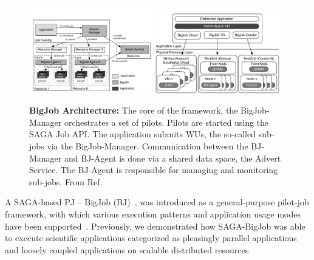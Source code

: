 \documentclass[]{svjour3}
\begin{document}
\begin{figure}[t]
  \centering
   \includegraphics[width=0.48\textwidth]{figures/re_bigjob_interactions.pdf}
  \includegraphics[width=0.48\textwidth]{figures/distributed_pilot_job.pdf}

        \caption{\textbf{BigJob Architecture:} The core of the
          framework, the BigJob-Manager orchestrates a set of
          pilots. Pilots are started using the SAGA Job API. The
          application submits WUs, the so-called sub-jobs via the
          BigJob-Manager. Communication between the BJ-Manager and
          BJ-Agent is done via a shared data space, the Advert
          Service. The BJ-Agent is responsible for managing and
          monitoring sub-jobs. From
          Ref.~\cite{saga_bigjob_condor_cloud}}
        \label{fig:figures_re_bigjob_interactions}
\end{figure}

A SAGA-based PJ -- BigJob
(BJ)~\cite{bigjob_web,saga_bigjob_condor_cloud}, was introduced as a
general-purpose pilot-job framework, with which various execution
patterns and application usage modes have been
supported~\cite{async_repex11,saga-royalsoc}. Previously, we
demonstrated how SAGA-BigJob was able to execute scientific
applications categorized as pleasingly parallel applications and
loosely coupled applications on scalable distributed
resources\cite{DBLP:conf/hpdc/KimHMAJ10, dare-ecmls11}
\end{document}
